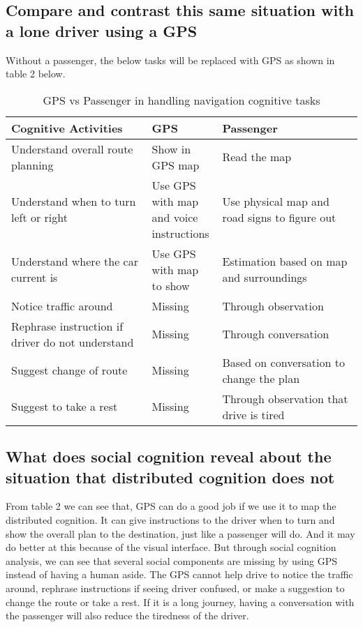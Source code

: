 \documentclass[
	letterpaper, %
]{jdf}
\begin{document}
\subsection{Compare and contrast this same situation with a lone driver using a GPS}
Without a passenger, the below tasks will be replaced with GPS as shown in table 2 below.

\begin{table}[h] %
	\caption{GPS vs Passenger in handling navigation cognitive tasks}
	\small %
	\centering %
	\begin{tabular}{L{0.4\linewidth} L{0.2\linewidth} L{0.4\linewidth}}
		\textbf{Cognitive Activities} & \textbf{GPS} & \textbf{Passenger}\\
		\toprule[0.5pt]
		Understand overall route planning & Show in GPS map & Read the map \\
		\midrule
		Understand when to turn left or right & Use GPS with map and voice instructions & Use physical map and road signs to figure out \\
		\midrule
		Understand where the car current is & Use GPS with map to show & Estimation based on map and surroundings \\
		\midrule
		Notice traffic around & Missing & Through observation \\
		\midrule
		Rephrase instruction if driver do not understand & Missing & Through conversation \\
		\midrule
		Suggest change of route & Missing & Based on conversation to change the plan\\
		\midrule
		Suggest to take a rest & Missing & Through observation that drive is tired \\
	\end{tabular}
\end{table}

\subsection{What does social cognition reveal about the situation that distributed cognition does not}

From table 2 we can see that, GPS can do a good job if we use it to map the distributed cognition. It can give instructions to the driver when to turn and show the overall plan to the destination, just like a passenger will do. And it may do better at this because of the visual interface. But through social cognition analysis, we can see that several social components are missing by using GPS instead of having a human aside. The GPS cannot help drive to notice the traffic around, rephrase instructions if seeing driver confused, or make a suggestion to change the route or take a rest. If it is a long journey, having a conversation with the passenger will also reduce the tiredness of the driver.
\end{document}
